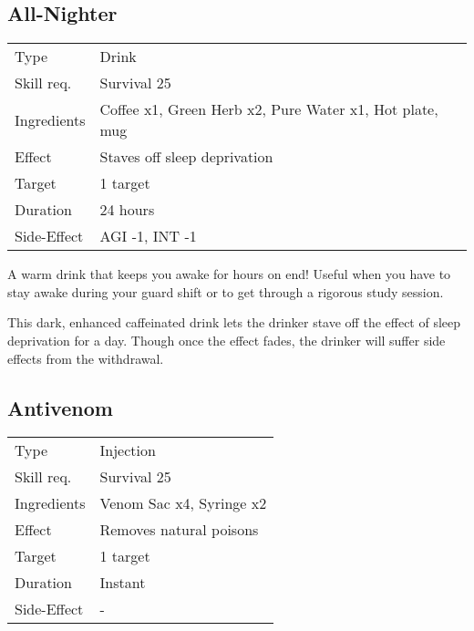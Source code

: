 \documentclass[11pt,a4paper,twocolumn]{book}
\begin{document}
\subsection*{All-Nighter}
{
	\begin{tabu} to 75mm{| X[l,4] | X[l,8] |}
		\hline
		Type 			& Drink 													\\
		Skill req.	    & Survival 25 												\\
		Ingredients     & Coffee x1, Green Herb x2, Pure Water x1, Hot plate, mug	\\
		Effect     		& Staves off sleep deprivation 								\\
		Target      	& 1 target													\\
		Duration  		& 24 hours	 												\\
		Side-Effect     & AGI -1, INT -1											\\ \hline
	\end{tabu}
	
}
\medskip

A warm drink that keeps you awake for hours on end! Useful when you have to stay awake during your guard shift or to get through a rigorous study session.

This dark, enhanced caffeinated drink lets the drinker stave off the effect of sleep deprivation for a day. Though once the effect fades, the drinker will suffer side effects from the withdrawal.

\vfill


\subsection*{Antivenom}
{
	\begin{tabu} to 75mm{| X[l,4] | X[l,8] |}
		\hline
		Type 			& Injection 												\\
		Skill req.	    & Survival 25 										\\
		Ingredients     & Venom Sac x4, Syringe x2									\\
		Effect     		& Removes natural poisons		\\
		Target      	& 1 target													\\
		Duration  		& Instant	 												\\
		Side-Effect     & -															\\ \hline
	\end{tabu}
	
}
\end{document}
